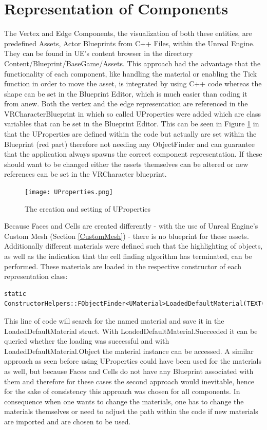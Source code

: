 \documentclass{report}
\begin{document}
	\section{Representation of Components} \label{ComponentRepresentation}
	\startsection
		The Vertex and Edge Components, the visualization of both these entities, are predefined Assets, Actor Blueprints from C++ Files, within the Unreal Engine. They can be found in UE's content browser in the directory Content/Blueprint/BaseGame/Assets. This approach had the advantage that the functionality of each component, like handling the material or enabling the Tick function in order to move the asset, is integrated by using C++ code whereas the shape can be set in the Blueprint Editor, which is much easier than coding it from anew. Both the vertex and the edge representation are referenced in the VRCharacterBlueprint in which so called UProperties were added which are class variables that can be set in the Blueprint Editor. This can be seen in Figure \ref{UProperties} in that the UProperties are defined within the code but actually are set within the Blueprint (red part) therefore not needing any ObjectFinder and can guarantee that the application always spawns the correct component representation. If these should want to be changed either the assets themselves can be altered or new references can be set in the VRCharacter blueprint.
		\begin{figure}[H]
			\begin{center}
				\texttt{[image: UProperties.png]} 
				\caption{The creation and setting of UProperties}
				\label{UProperties}
			\end{center}
		\end{figure}
		\noindent Because Faces and Cells are created differently - with the use of Unreal Engine's Custom Mesh (Section \ref{CustomMesh}) - there is no blueprint for these assets. \\
		Additionally different materials were defined such that the highlighting of objects, as well as the indication that the cell finding algorithm has terminated, can be performed. These materials are loaded in the respective constructor of each representation class:
		\begin{verbatim}
static ConstructorHelpers::FObjectFinder<UMaterial>LoadedDefaultMaterial(TEXT("path"));	
		\end{verbatim}
		This line of code will search for the named material and save it in the LoadedDefaultMaterial struct. With LoadedDefaultMaterial.Succeeded it can be queried whether the loading was successful and with LoadedDefaultMaterial.Object the material instance can be accessed. A similar approach as seen before using UProperties could have been used for the materials as well, but because Faces and Cells do not have any Blueprint associated with them and therefore for these cases the second approach would inevitable, hence for the sake of consistency this approach was chosen for all components. In consequence when one wants to change the materials, one has to change the materials themselves or need to adjust the path within the code if new materials are imported and are chosen to be used.
	\closesection
	
\end{document}

